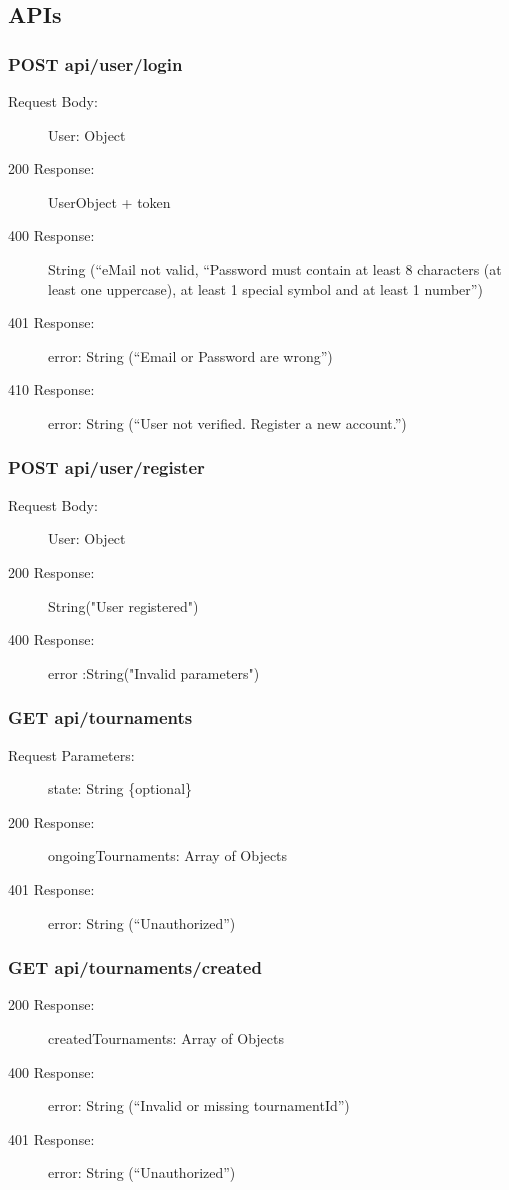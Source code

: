 \documentclass{Configuration_Files/Template}
\begin{document}
\subsection{APIs}

\subsubsection{POST api/user/login}
\begin{description}
    \item[Request Body:] User: Object
    \item[200 Response:] UserObject + token
    \item[400 Response:] String (“eMail not valid, “Password must contain at least 8 characters (at least one uppercase), at least 1 special symbol and at least 1 number”)
    \item[401 Response:] error: String (“Email or Password are wrong”)
    \item[410 Response:] error: String (“User not verified. Register a new account.”)
\end{description}

\subsubsection{POST api/user/register}
\begin{description}
    \item[Request Body:] User: Object
    \item[200 Response:] String("User registered")
    \item[400 Response:] error :String("Invalid parameters")
\end{description}

\subsubsection{GET api/tournaments}
\begin{description}
    \item[Request Parameters:] state: String \{optional\}
    \item[200 Response:] ongoingTournaments: Array of Objects
    \item[401 Response:] error: String (“Unauthorized”)
\end{description}

\subsubsection{GET api/tournaments/created}
\begin{description}
    \item[200 Response:] createdTournaments: Array of Objects
    \item[400 Response:] error: String (“Invalid or missing tournamentId”)
    \item[401 Response:] error: String (“Unauthorized”)
\end{description}
\end{document}

